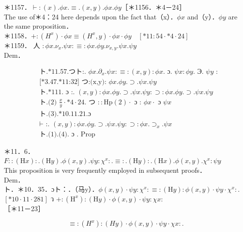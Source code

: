 \documentclass[10pt]{article}
\begin{document}
＊1157．$\vdash:(x) . \phi x . \equiv .(x, y) . \phi x . \phi y$［＊1156．＊4－24］\\
The use of＊4：24 here depends upon the fact that（x）．$\phi x$ and（y）．$\phi y$ are the same proposition．\\
＊1158．$+:\left(H^{x}\right) \cdot \phi x \equiv\left(H^{x}, y\right) \cdot \phi x \cdot \phi y \quad[* 11: 54 \cdot * 4 \cdot 24]$\\
＊1159． 人 $: \phi x . \nu_{x} . \psi x: \equiv: \phi x . \phi y . \nu_{x, y} . \psi x . \psi y$\\
Dem．


\begin{align*}
& \text { ト.*11.57.つト:. } \phi x . \partial_{x} . \psi x: \equiv:(x, y): \phi x . \text { ɔ. } \psi x: \phi y \text {. Э. } \psi y \text { : } \\
& \text { [*3.47.*11:32] つ:(x,y): } \phi x . \phi y . \supset . \psi x . \psi y  \tag{1}\\
& \text { ト.*111. ɔ :. }(x, y): \phi x . \phi y . \supset . \psi x . \psi y: \supset: \phi x . \phi y . \supset . \psi x . \psi y  \tag{2}\\
& \text { ト.(2) } \frac{x}{y} \cdot * 4 \cdot 24 . \text { つ }:: \mathrm{Hp}(2) \cdot \text { ɔ : } \phi x \cdot \text { ɔ } \psi x  \tag{3}\\
& \text { ト.(3).*10.11.21.ɔ } \\
& \text { ⊢ :. }(x, y): \phi x . \phi y . \supset . \psi x . \psi y: \supset: \phi x . \supset_{x} . \psi x  \tag{4}\\
& \text { ト.(1).(4). ɔ . Prop }
\end{align*}


＊11．6．$F::(\mathrm{H} x): .(\mathrm{H} y) . \phi(x, y) . \psi y: \chi^{x}: . \equiv: .(\mathrm{H} y): .(\mathrm{H} x) . \phi(x, y) . \chi^{x}: \psi y$\\
This proposition is very frequently employed in subsequent proofs．\\
Dem．\\
ト．＊10．35．ɔト：．（马y）．$\phi(x, y) \cdot \psi y: \chi^{x}: \equiv:(\mathrm{H} y): \phi(x, y) \cdot \psi y \cdot \chi^{x}:$.\\
$[* 10 \cdot 11 \cdot 281]$ ว $+:\left(\mathrm{H}^{x}\right):(\mathrm{H} y) \cdot \phi(x, y) \cdot \psi y: \chi x:$\\
［＊11－23］

$$
\equiv:\left(H^{x}\right):(H y) \cdot \phi(x, y) \cdot \psi y \cdot \chi x: .
$$
\end{document}
